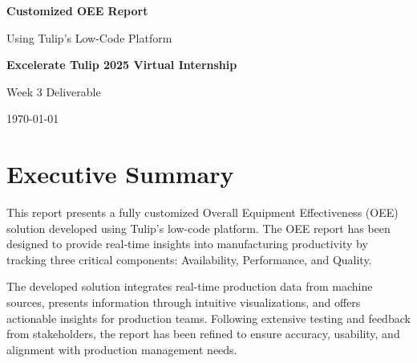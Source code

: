 \documentclass[11pt,a4paper]{article}
\begin{document}
\begin{titlepage}
    \centering
    \vspace*{1cm}
    {\Huge \textbf{Customized OEE Report}\par}
    \vspace{1.5cm}
    {\Large Using Tulip's Low-Code Platform\par}
    \vspace{2cm}
    {\large \textbf{Excelerate Tulip 2025 Virtual Internship}\par}
    \vspace{0.5cm}
    {\large Week 3 Deliverable\par}
    \vspace{3cm}
    
    \begin{figure}[h]
        \centering
    \end{figure}
    
    \vfill
    {\large \today\par}
\end{titlepage}

\tableofcontents
\newpage

\section{Executive Summary}

This report presents a fully customized Overall Equipment Effectiveness (OEE) solution developed using Tulip's low-code platform. The OEE report has been designed to provide real-time insights into manufacturing productivity by tracking three critical components: Availability, Performance, and Quality.

The developed solution integrates real-time production data from machine sources, presents information through intuitive visualizations, and offers actionable insights for production teams. Following extensive testing and feedback from stakeholders, the report has been refined to ensure accuracy, usability, and alignment with production management needs.
\end{document}
